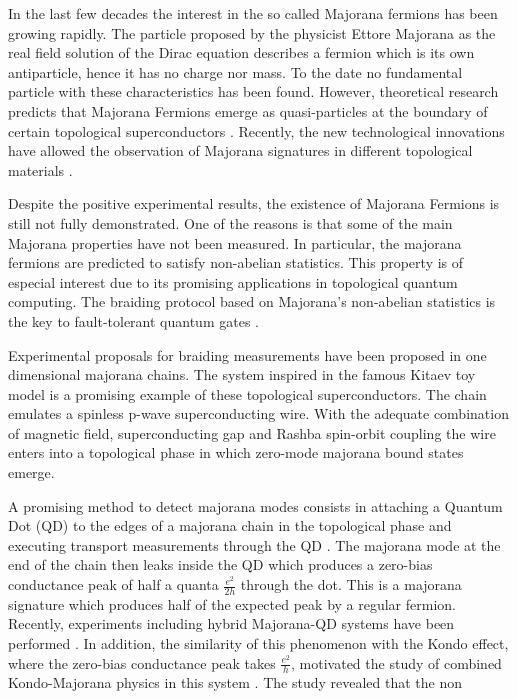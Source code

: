 \documentclass[showpacs,aps,prb,reprint,superscriptaddress]{revtex4-1}
\begin{document}
In the last few decades the interest in the so called Majorana fermions has been growing rapidly. The particle proposed by the physicist Ettore Majorana  as the real field solution of the Dirac equation describes a fermion which is its own antiparticle, hence it has no charge nor mass. To the date no fundamental particle with these characteristics has been found. However,  theoretical research predicts that Majorana Fermions emerge as quasi-particles at the boundary of certain topological superconductors . Recently, the new technological innovations have allowed the observation of Majorana signatures in different topological materials \citep{mourik_signatures_2012,das_zero-bias_2012,deng_anomalous_2012,zhang_quantized_2018} . 

Despite the positive experimental results, the existence of  Majorana   Fermions is still not fully demonstrated. One of the reasons  is that some of the main Majorana properties have not been measured. In particular, the majorana fermions are predicted to satisfy non-abelian statistics. This property is of especial interest due to its promising applications in topological quantum computing. The braiding protocol based on  Majorana's non-abelian statistics is the key to  fault-tolerant quantum gates \cite{sarma_majorana_2015}. 

Experimental proposals for braiding measurements have been  proposed  in one dimensional majorana chains.  The system inspired in the famous Kitaev toy model is a promising example of these topological superconductors.  The chain emulates a spinless p-wave superconducting wire. With the adequate combination of magnetic field,  superconducting gap and Rashba spin-orbit coupling  the wire enters into a topological phase in which zero-mode majorana bound states emerge. 

A promising method to detect majorana modes consists in attaching a Quantum Dot (QD) to the edges of a majorana chain in the topological phase and executing transport measurements through the QD \cite{liu_detecting_2011} . The majorana mode at the end of the chain then leaks inside the QD \cite{vernek_subtle_2014} which produces a zero-bias conductance peak of half a quanta $\frac{e^{2}}{2h}$ through the dot. This is a majorana signature which produces half of the expected peak by a regular fermion.  Recently, experiments including hybrid Majorana-QD systems have been performed \cite{deng_majorana_2016} . In addition, the similarity of this phenomenon with the Kondo effect, where the zero-bias conductance peak takes  $\frac{e^{2}}{h}$, motivated the study of combined Kondo-Majorana physics in this system \cite{lee_kondo_2013,ruiz-tijerina_interaction_2015}. The study revealed that the non  \\
\end{document}
